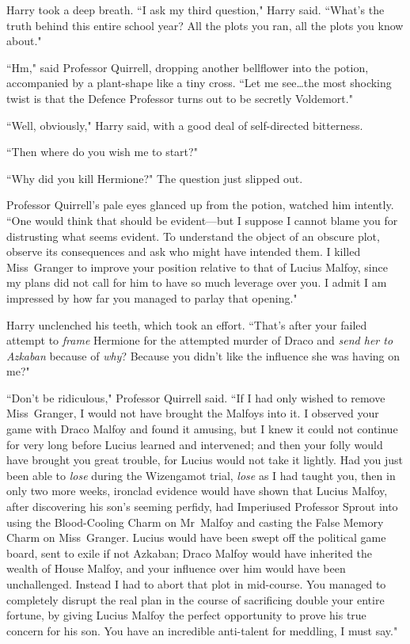 Harry took a deep breath. ``I ask my third question," Harry said. ``What's the truth behind this entire school year? All the plots you ran, all the plots you know about."

``Hm," said Professor Quirrell, dropping another bellflower into the potion, accompanied by a plant-shape like a tiny cross. ``Let me see…the most shocking twist is that the Defence Professor turns out to be secretly Voldemort."

``Well, obviously," Harry said, with a good deal of self-directed bitterness.

``Then where do you wish me to start?"

``Why did you kill Hermione?" The question just slipped out.

Professor Quirrell's pale eyes glanced up from the potion, watched him intently. ``One would think that should be evident—but I suppose I cannot blame you for distrusting what seems evident. To understand the object of an obscure plot, observe its consequences and ask who might have intended them. I killed Miss~Granger to improve your position relative to that of Lucius Malfoy, since my plans did not call for him to have so much leverage over you. I admit I am impressed by how far you managed to parlay that opening."

Harry unclenched his teeth, which took an effort. ``That's after your failed attempt to \emph{frame} Hermione for the attempted murder of Draco and \emph{send her to Azkaban} because of \emph{why}? Because you didn't like the influence she was having on me?"

``Don't be ridiculous," Professor Quirrell said. ``If I had only wished to remove Miss~Granger, I would not have brought the Malfoys into it. I observed your game with Draco Malfoy and found it amusing, but I knew it could not continue for very long before Lucius learned and intervened; and then your folly would have brought you great trouble, for Lucius would not take it lightly. Had you just been able to \emph{lose} during the Wizengamot trial, \emph{lose} as I had taught you, then in only two more weeks, ironclad evidence would have shown that Lucius Malfoy, after discovering his son's seeming perfidy, had Imperiused Professor Sprout into using the Blood-Cooling Charm on Mr~Malfoy and casting the False Memory Charm on Miss~Granger. Lucius would have been swept off the political game board, sent to exile if not Azkaban; Draco Malfoy would have inherited the wealth of House Malfoy, and your influence over him would have been unchallenged. Instead I had to abort that plot in mid-course. You managed to completely disrupt the real plan in the course of sacrificing double your entire fortune, by giving Lucius Malfoy the perfect opportunity to prove his true concern for his son. You have an incredible anti-talent for meddling, I must say."


